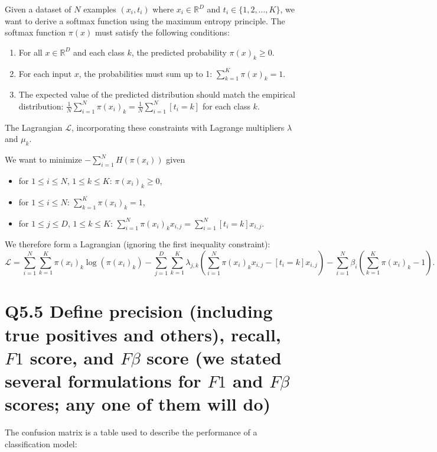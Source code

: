 \documentclass[11pt]{article}
\begin{document}
Given a dataset of $N$ examples $(x_i, t_i)$ where $x_i \in \mathbb{R}^D$ and $t_i \in \{1, 2, \ldots, K\}$, we want to derive a softmax function using the maximum entropy principle. The softmax function $\pi(x)$ must satisfy the following conditions:

\begin{enumerate}
    \item For all $x \in \mathbb{R}^D$ and each class $k$, the predicted probability $\pi(x)_k \geq 0$.
    \item For each input $x$, the probabilities must sum up to 1: $\sum_{k=1}^K \pi(x)_k = 1$.
    \item The expected value of the predicted distribution should match the empirical distribution: $\frac{1}{N} \sum_{i=1}^N \pi(x_i)_k = \frac{1}{N} \sum_{i=1}^N [t_i = k]$ for each class $k$.
\end{enumerate}

The Lagrangian $\mathcal{L}$, incorporating these constraints with Lagrange multipliers $\lambda$ and $\mu_k$.

We want to minimize $-\sum_{i=1}^{N} H(\pi(x_i))$ given
\begin{itemize}
    \item for $1 \leq i \leq N$, $1 \leq k \leq K$: $\pi(x_i)_k \geq 0$,
    \item for $1 \leq i \leq N$: $\sum_{k=1}^{K} \pi(x_i)_k = 1$,
    \item for $1 \leq j \leq D$, $1 \leq k \leq K$: $\sum_{i=1}^{N} \pi(x_i)_k x_{i,j} = \sum_{i=1}^{N} [t_i = k] x_{i,j}$.
\end{itemize}

We therefore form a Lagrangian (ignoring the first inequality constraint):
\[
\mathcal{L} = \sum_{i=1}^{N} \sum_{k=1}^{K} \pi(x_i)_k \log(\pi(x_i)_k) 
- \sum_{j=1}^{D} \sum_{k=1}^{K} \lambda_{j,k} \left( \sum_{i=1}^{N} \pi(x_i)_k x_{i,j} - [t_i = k] x_{i,j} \right) 
- \sum_{i=1}^{N} \beta_i \left( \sum_{k=1}^{K} \pi(x_i)_k - 1 \right).
\]


\section{Q5.5 Define precision (including true positives and others), recall, $F1$ score, and $F\beta$ score (we stated several formulations for $F1$ and $F\beta$ scores; any one of them will do)}

The confusion matrix is a table used to describe the performance of a classification model:
\end{document}
